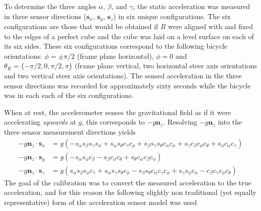 To determine the three angles $\alpha$, $\beta$, and $\gamma$, the static
acceleration was measured in three sensor directions ($\bm{s}_x$, $\bm{s}_y$,
$\bm{s}_z$) in six unique configurations. The six configurations are those that
would be obtained if $R$ were aligned with and fixed to the edges of a perfect
cube and the cube was laid on a level surface on each of its six sides.  These
six configurations correspond to the following bicycle orientations:
$\phi=\pm\pi/2$ (frame plane horizontal), $\phi=0$ and $\theta_R = \{-\pi/2, 0,
\pi/2, \pi\}$ (frame plane vertical, two horizontal steer axis orientations and
two vertical steer axis orientations). The sensed acceleration in the three sensor
directions was recorded for approximately sixty seconds while the bicycle was
in each each of the six configurations.

When at rest, the accelerometer senses the gravitational field as if it were
accelerating \textit{upwards} at $g$, this corresponds to $-g\bm{n}_z$.
Resolving $-g\bm{n}_z$ into the three sensor measurement directions yields
\begin{align}
  \label{rb:eq:imux}
-g\bm{n}_z \cdot \bm{s}_x &= g \left(- s_{\alpha}
s_{\beta} s_{\gamma}
s_{\phi} + s_{\alpha}
s_{\theta} c_{\gamma}
c_{\phi} + s_{\beta}
s_{\gamma} s_{\theta}
c_{\alpha} c_{\phi} +
s_{\gamma} c_{\beta}
c_{\phi} c_{\theta} +
s_{\phi} c_{\alpha}
c_{\gamma}\right) \\
%
  \label{rb:eq:imuy}
-g\bm{n}_z \cdot \bm{s}_y &= g \left(- s_{\alpha}
s_{\phi} c_{\beta} -
s_{\beta} c_{\phi}
c_{\theta} + s_{\theta}
c_{\alpha} c_{\beta}
c_{\phi}\right) \\
%
  \label{rb:eq:imuz}
-g\bm{n}_z \cdot \bm{s}_z &= g \left(s_{\alpha}
s_{\beta} s_{\phi}
c_{\gamma} + s_{\alpha}
s_{\gamma} s_{\theta}
c_{\phi} - s_{\beta}
s_{\theta} c_{\alpha}
c_{\gamma} c_{\phi} +
s_{\gamma} s_{\phi}
c_{\alpha} - c_{\beta}
c_{\gamma} c_{\phi}
c_{\theta}\right)
\end{align}
The goal of the calibration was to convert the measured acceleration to the
true acceleration, and for this reason the following slightly non traditional
(yet equally representative) form of the acceleration sensor model was used
